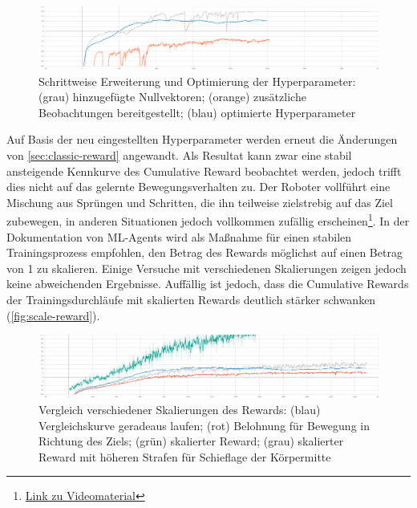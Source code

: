 \begin{figure}
    \centering
    \includegraphics[width = \textwidth]{Bilder/ml-agents/Environment_Cumulative Reward-add-observations.pdf}
    \caption[Schrittweise Erweiterung und Optimierung der Hyperparameter]{Schrittweise Erweiterung und Optimierung der Hyperparameter: (grau) hinzugefügte Nullvektoren; (orange) zusätzliche Beobachtungen bereitgestellt; (blau) optimierte Hyperparameter}
    \label{fig:optimierte-hyperparameter}
\end{figure}

Auf Basis der neu eingestellten Hyperparameter werden erneut die Änderungen von \autoref{sec:classic-reward} angewandt.
Als Resultat kann zwar eine stabil ansteigende Kennkurve des Cumulative Reward beobachtet werden, jedoch trifft dies nicht auf das gelernte Bewegungsverhalten zu.
Der Roboter vollführt eine Mischung aus Sprüngen und Schritten, die ihn teilweise zielstrebig auf das Ziel zubewegen, in anderen Situationen jedoch vollkommen zufällig erscheinen\footnote{\href{https://github.com/yschiebelhut/studienarbeit-doc/raw/master/Videos/SpiderBotDemos/14a-calmed-reward-scaled.webm}{Link zu Videomaterial}}.
In der Dokumentation von ML-Agents wird als Maßnahme für einen stabilen Trainingsprozess empfohlen, den Betrag des Rewards möglichst auf einen Betrag von 1 zu skalieren.
Einige Versuche mit verschiedenen Skalierungen zeigen jedoch keine abweichenden Ergebnisse.
Auffällig ist jedoch, dass die Cumulative Rewards der Trainingsdurchläufe mit skalierten Rewards deutlich stärker schwanken (\autoref{fig:scale-reward}).

\begin{figure}
    \centering
    \includegraphics[width = \textwidth]{Bilder/ml-agents/Environment_Cumulative Reward-scale-reward.pdf}
    \caption[Vergleich verschiedener Skalierungen des Rewards]{Vergleich verschiedener Skalierungen des Rewards: (blau) Vergleichskurve geradeaus laufen; (rot) Belohnung für Bewegung in Richtung des Ziels; (grün) skalierter Reward; (grau) skalierter Reward mit höheren Strafen für Schieflage der Körpermitte}
    \label{fig:scale-reward}
\end{figure}


